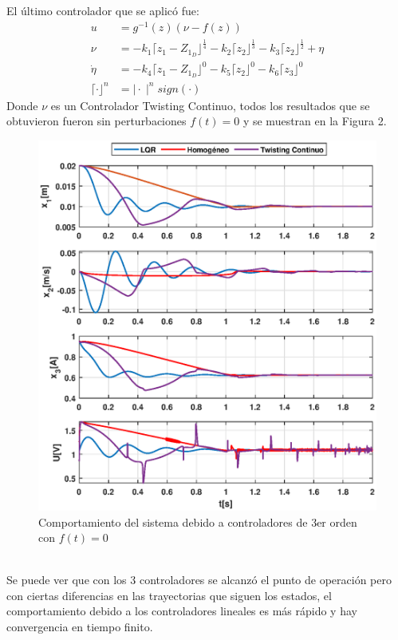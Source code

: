 \documentclass[onecolumn,10pt]{article}
\begin{document}
El \'ultimo controlador que se aplic\'o fue:
\begin{equation*}
\begin{split}
 u&=g^{-1}(z)(\nu-f(z))\\
 \nu&=-k_1\lceil z_1-Z_{1_{D}} \rfloor ^{\frac{1}{4}}-k_2\lceil z_2 \rfloor ^{\frac{1}{3}}-k_3\lceil z_2 \rfloor ^{\frac{1}{2}}+\eta\\
 \dot{\eta}&=-k_4\lceil z_1-Z_{1_{D}} \rfloor ^{0}-k_5\lceil z_2 \rfloor ^{0}-k_6\lceil z_3 \rfloor ^{0}\\
 \lceil\cdot\rfloor^{n}&=\mid \cdot \mid^{n} sign(\cdot)
\end{split}
\end{equation*}
Donde $\nu$ es un Controlador Twisting Continuo, todos los resultados que se obtuvieron fueron sin perturbaciones $f(t)=0$ y se muestran en la Figura 2.
\begin{figure}[!h]
\centering
\includegraphics[scale=0.55]{xu_3o_c3o.eps}
\caption{Comportamiento del sistema debido a controladores de 3er orden con $f(t)=0$}
\end{figure}
\\
Se puede ver que con los 3 controladores se alcanz\'o el punto de operaci\'on pero con ciertas diferencias en las trayectorias que siguen los estados, el comportamiento debido a los controladores lineales es m\'as r\'apido y hay convergencia en tiempo finito.
\end{document}
